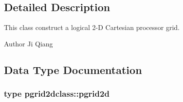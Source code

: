 \subsection{Detailed Description}
This class construct a logical 2-\/D Cartesian processor grid. 

\begin{DoxyAuthor}{Author}
Ji Qiang 
\end{DoxyAuthor}


\subsection{Data Type Documentation}
\label{structpgrid2dclass_1_1pgrid2d}
\subsubsection{type pgrid2dclass\+::pgrid2d}

